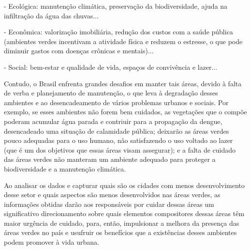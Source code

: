\documentclass[12pt]{article}
\begin{document}
    - Ecológica: manutenção climática, preservação da biodiversidade, ajuda na infiltração da água das chuvas...
    
    - Econômica: valorização imobiliária, redução dos custos com a saúde pública (ambientes verdes incentivam a atividade física e reduzem o estresse, o que pode diminuir gastos com doenças crônicas e mentais)...
    
    - Social: bem-estar e qualidade de vida, espaços de convivência e lazer...
    
    Contudo, o Brasil enfrenta grandes desafios em manter tais áreas, devido à falta de verba e planejamento de manutenção, o que leva à degradação desses ambientes e ao desencadeamento de vários problemas urbanos e sociais. Por exemplo, se esses ambientes não forem bem cuidados, as vegetações que o compõe poderam acumular água parada e contriuir para a propagação da dengue, desencadeado uma situação de calamidade pública; deixarão as áreas verdes pouco adequadas para o uso humano, não satisfazendo o uso voltado ao lazer (que é um dos objetivos que essas áreas visam assegurar); e a falta de cuidado das áreas verdes não manteram um ambiente adequado para proteger a biodiversidade e a manutenção climática.

    Ao analisar os dados e capturar quais são os cidades com menos desenvolvimento desse setor e quais aspectos são menos desenvolvidos nas áreas verdes, as informações obtidas darão aos responsáveis por cuidar dessas áreas um significativo direcionamento sobre quais elementos compositores dessas áreas têm maior urgência de cuidado, para, então, impulsionar a melhora da presença das áreas verdes no país e usufruir os benefícios que a existências desses ambientes podem promover à vida urbana.
\end{document}
